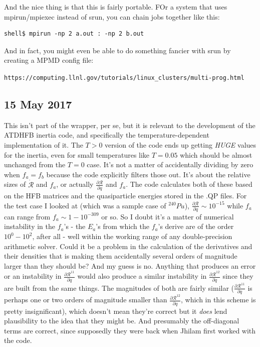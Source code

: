 \documentclass[]{report}
\begin{document}
And the nice thing is that this is fairly portable. FOr a system that uses mpirun/mpiexec instead of srun, you can chain jobs together like this:

\begin{verbatim}
shell$ mpirun -np 2 a.out : -np 2 b.out
\end{verbatim}

And in fact, you might even be able to do something fancier with srun by creating a MPMD config file:

\noindent\verb|https://computing.llnl.gov/tutorials/linux_clusters/multi-prog.html|

\subsection*{15 May 2017}

This isn't part of the wrapper, per se, but it is relevant to the development of the ATDHFB inertia code, and specifically the temperature-dependent implementation of it. The $T>0$ version of the code ends up getting \textit{HUGE} values for the inertia, even for small temperatures like $T=0.05$ which should be almost unchanged from the $T=0$ case. It's not a matter of accidentally dividing by zero when $f_a=f_b$ because the code explicitly filters those out. It's about the relative sizes of $\dot{\mathcal{R}}$ and $f_a$, or actually $\frac{\partial \mathcal{R}}{\partial q}$ and $f_a$. The code calculates both of these based on the HFB matrices and the quasiparticle energies stored in the .QP files. For the test case I looked at (which was a sample case of $^{240}Pu$), $\frac{\partial \mathcal{R}}{\partial q}\sim 10^{-15}$ while $f_a$ can range from $f_a \sim 1-10^{-309}$ or so. So I doubt it's a matter of numerical instability in the $f_a$'s - the $E_a$'s from which the $f_a$'s derive are of the order $10^0-10^2$, after all - well within the working range of any double-precision arithmetic solver. Could it be a problem in the calculation of the derivatives and their densities that is making them accidentally several orders of magnitude larger than they should be? And my guess is no. Anything that produces an error or an instability in $\frac{\partial \mathcal{R}^{11}}{\partial q}$ would also produce a similar instability in $\frac{\partial \mathcal{R}^{12}}{\partial q}$ since they are built from the same things. The magnitudes of both are fairly similar ($\frac{\partial \mathcal{R}^{11}}{\partial q}$ is perhaps one or two orders of magnitude smaller than $\frac{\partial \mathcal{R}^{12}}{\partial q}$, which in this scheme is pretty insignificant), which doesn't mean they're correct but it \textit{does} lend plausibility to the idea that they might be. And presumably the off-diagonal terms are correct, since supposedly they were back when Jhilam first worked with the code.
\end{document}
